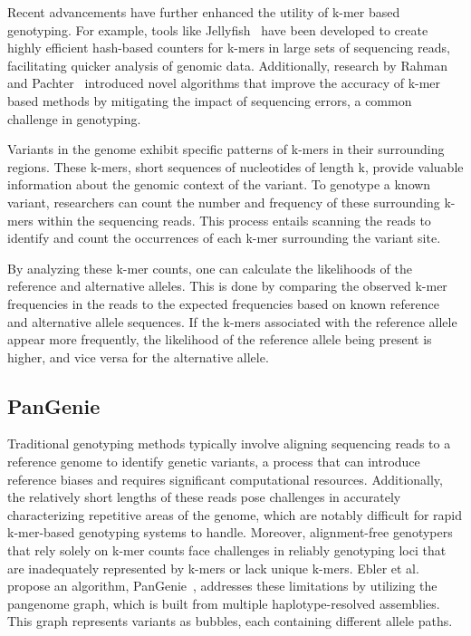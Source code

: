 \documentclass[PhD]{PHlab-thesis}
\begin{document}
Recent advancements have further enhanced the utility of k-mer based genotyping. For example, tools like Jellyfish~\cite{Jellyfish} have been developed to create highly efficient hash-based counters for k-mers in large sets of sequencing reads, facilitating quicker analysis of genomic data. Additionally, research by Rahman and Pachter~\cite{CGAL} introduced novel algorithms that improve the accuracy of k-mer based methods by mitigating the impact of sequencing errors, a common challenge in genotyping.

Variants in the genome exhibit specific patterns of k-mers in their surrounding regions. These k-mers, short sequences of nucleotides of length k, provide valuable information about the genomic context of the variant. To genotype a known variant, researchers can count the number and frequency of these surrounding k-mers within the sequencing reads. This process entails scanning the reads to identify and count the occurrences of each k-mer surrounding the variant site.

By analyzing these k-mer counts, one can calculate the likelihoods of the reference and alternative alleles. This is done by comparing the observed k-mer frequencies in the reads to the expected frequencies based on known reference and alternative allele sequences. If the k-mers associated with the reference allele appear more frequently, the likelihood of the reference allele being present is higher, and vice versa for the alternative allele.

\subsection{PanGenie}
Traditional genotyping methods typically involve aligning sequencing reads to a reference genome to identify genetic variants, a process that can introduce reference biases and requires significant computational resources. Additionally, the relatively short lengths of these reads pose challenges in accurately characterizing repetitive areas of the genome, which are notably difficult for rapid k-mer-based genotyping systems to handle. Moreover, alignment-free genotypers that rely solely on k-mer counts face challenges in reliably genotyping loci that are inadequately represented by k-mers or lack unique k-mers. Ebler et al. propose an algorithm, PanGenie~\cite{elber2022PanGenie}, addresses these limitations by utilizing the pangenome graph, which is built from multiple haplotype-resolved assemblies. This graph represents variants as bubbles, each containing different allele paths.
\end{document}
